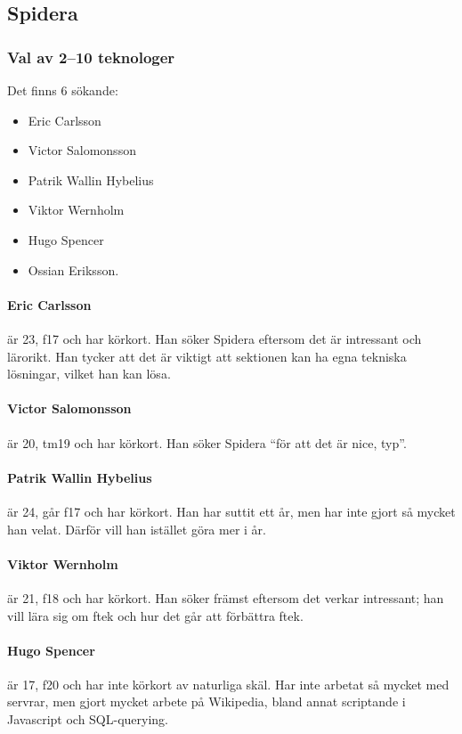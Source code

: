 \documentclass[hidelinks]{sektionsmote}
\begin{document}
\subsection{Spidera}
\subsubsection{Val av 2--10 teknologer}
Det finns 6 sökande:
\begin{itemize}
    \item Eric Carlsson
    \item Victor Salomonsson
    \item Patrik Wallin Hybelius
    \item Viktor Wernholm
    \item Hugo Spencer
    \item Ossian Eriksson.
\end{itemize}

\paragraph{Eric Carlsson} är 23, f17 och har körkort.
Han söker Spidera eftersom det är intressant och lärorikt.
Han tycker att det är viktigt att sektionen kan ha egna tekniska lösningar, vilket han kan lösa.

\paragraph{Victor Salomonsson} är 20, tm19 och har körkort.
Han söker Spidera \enquote{för att det är nice, typ}.

\paragraph{Patrik Wallin Hybelius} är 24, går f17 och har körkort.
Han har suttit ett år, men har inte gjort så mycket han velat.
Därför vill han istället göra mer i år.

\paragraph{Viktor Wernholm} är 21, f18 och har körkort.
Han söker främst eftersom det verkar intressant; han vill lära sig om ftek och hur det går att förbättra ftek.

\paragraph{Hugo Spencer} är 17, f20 och har inte körkort av naturliga skäl.
Har inte arbetat så mycket med servrar, men gjort mycket arbete på Wikipedia, bland annat scriptande i Javascript och SQL-querying.
\end{document}
